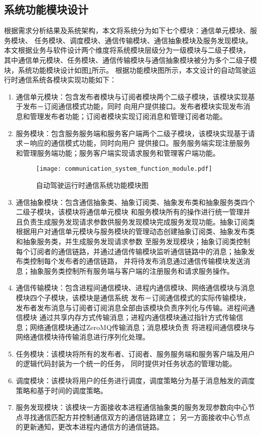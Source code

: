 \subsection{系统功能模块设计}
根据需求分析结果及系统架构，本文将系统分为如下七个模块：通信单元模块、服务模块、
任务模块、调度模块、通信传输模块、通信抽象模块及服务发现模块。本文根据业务与软件设计两个维度将系统模块层级分为一级模块与二级子模块，
其中通信单元模块、任务模块、通信传输模块与通信抽象模块被分为多个二级子模块，系统功能模块设计如图\ref{communication_system_function_module}所示。
根据功能模块图所示，本文设计的自动驾驶运行时通信系统各模块实现功能如下：
\begin{enumerate}
  \item 通信单元模块：包含发布者模块与订阅者模块两个二级子模块，该模块实现基于发布－订阅通信模式功能，同时
  向用户提供接口。发布者模块实现发布消息和管理发布者功能；订阅者模块实现订阅消息和管理订阅者功能。
  \item 服务模块：包含服务服务端和服务客户端两个二级子模块，该模块实现基于请求－响应的通信模式功能，同时向用户
  提供接口。服务服务端实现注册服务和管理服务端功能；服务客户端实现请求服务和管理客户端功能。
  \begin{figure}[htb]
    \centering
    \texttt{[image: communication\_system\_function\_module.pdf]}
    \caption{自动驾驶运行时通信系统功能模块图}
    \label{communication_system_function_module}
  \end{figure}
  \item 通信抽象模块：包含通信抽象类、抽象订阅类、抽象发布类和抽象服务类四个二级子模块，该模块将通信单元模块
  和服务模块所有的操作进行统一管理并且负责生成服务发现请求参数供服务发现模块完成服务发现功能。抽象订阅类
  根据用户对通信单元模块与服务模块的管理动态创建抽象订阅类、抽象发布类和抽象服务类，并生成服务发现请求参数
  至服务发现模块；抽象订阅类控制每个订阅者的通信链路，并通过通信传输模块监听通信链路中的消息；抽象发布类控制每个发布者的通信链路，
  并将待发布消息通过通信传输模块发送消息；抽象服务类控制所有服务端与客户端的注册服务和请求服务操作。
  \item 通信传输模块：包含进程间通信模块、进程内通信模块、网络通信模块与消息模块四个子模块，该模块是通信系统
  发布－订阅通信模式的实际传输模块，发布者发布消息与订阅者订阅消息全部由该模块负责序列化与传输。进程间通信模块
  通过共享内存方式传输消息；进程内通信模块通过指针方式传输信息；网络通信模块通过ZeroMQ传输消息；消息模块负责
  将进程间通信模块与网络通信模块待传输消息进行序列化处理。
  \item 任务模块：该模块将所有的发布者、订阅者、服务服务端和服务客户端及用户的逻辑代码封装为一个统一的任务，
  同时提供对任务状态的管理功能。
  \item 调度模块：该模块将用户的任务进行调度，调度策略分为基于消息触发的调度策略和基于时间的调度策略。
  \item 服务发现模块：该模块一方面接收本进程通信抽象类的服务发现参数向中心节点寻找通信匹配方并控制通信双方的通信链路建立；
  另一方面接收中心节点的更新通知，更改本进程内通信方的通信链路。
\end{enumerate}


